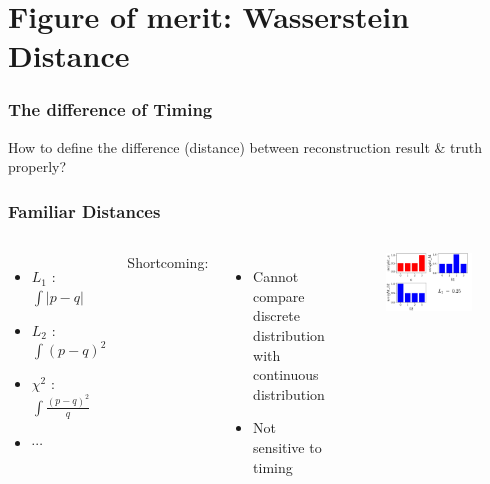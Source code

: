 \documentclass{beamer}
\begin{document}
\section{Figure of merit: Wasserstein Distance}
\begin{frame}
\frametitle{The difference of Timing}
\begin{center}
    How to define the difference (distance) between reconstruction result \& truth properly?
\end{center}
\end{frame}

\begin{frame}
\frametitle{Familiar Distances}
\begin{columns}
\begin{itemize}
    \item $L_{1}$ : $\int|p-q|$
    \item $L_{2}$ : $\int(p-q)^{2}$
    \item $\chi^{2}$ : $\int\frac{(p-q)^{2}}{q}$
    \item $\cdots$
\end{itemize}
Shortcoming:
\begin{itemize}
    \item Cannot compare discrete distribution with continuous distribution
    \item Not sensitive to timing
\end{itemize}
\begin{figure}
    \centering
    \includegraphics[width=1.0\linewidth]{img/tab.png}
\end{figure}
\end{columns}
\end{frame}
\end{document}
